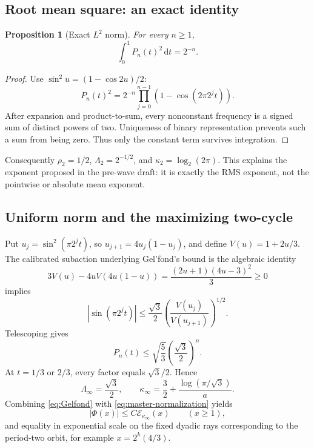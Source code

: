 \documentclass[11pt]{article}
\newtheorem{proposition}[theorem]{Proposition}
\theoremstyle{definition}
\theoremstyle{remark}
\newcommand{\dd}{\,\mathrm d}
\newcommand{\Ecal}{\mathcal E}
\begin{document}
\subsection{Root mean square: an exact identity}

\begin{proposition}[Exact \(L^2\) norm]
\label{prop:L2}
For every \(n\ge1\),
\begin{equation}
 \int_0^1P_n(t)^2\dd t=2^{-n}.
 \label{eq:L2}
\end{equation}
\end{proposition}

\begin{proof}
Use \(\sin^2u=(1-\cos2u)/2\):
\[
 P_n(t)^2=2^{-n}\prod_{j=0}^{n-1}
 (1-\cos(2\pi2^jt)).
\]
After expansion and product-to-sum, every nonconstant frequency is a signed
sum of distinct powers of two.  Uniqueness of binary representation prevents
such a sum from being zero.  Thus only the constant term survives integration.
\end{proof}
Consequently \(\rho_2=1/2\), \(\Lambda_2=2^{-1/2}\), and
\(\kappa_2=\log_2(2\pi)\).  This explains the exponent proposed in the
pre-wave draft: it is exactly the RMS exponent, not the pointwise or absolute
mean exponent.

\subsection{Uniform norm and the maximizing two-cycle}

Put \(u_j=\sin^2(\pi2^jt)\), so
\(u_{j+1}=4u_j(1-u_j)\), and define
\(V(u)=1+2u/3\).  The calibrated subaction underlying Gel'fond's bound\cite{gelfond} is the algebraic identity
\begin{equation}
 3V(u)-4uV(4u(1-u))
 =\frac{(2u+1)(4u-3)^2}{3}\ge0
 \label{eq:subaction-identity}
\end{equation}
implies
\begin{equation}
 |\sin(\pi2^jt)|
 \le\frac{\sqrt3}{2}
 \left(\frac{V(u_j)}{V(u_{j+1})}\right)^{1/2}.
 \label{eq:one-step-Gelfond}
\end{equation}
Telescoping gives
\begin{equation}
 P_n(t)\le\sqrt{\frac53}\left(\frac{\sqrt3}{2}\right)^n.
 \label{eq:Gelfond}
\end{equation}
At \(t=1/3\) or \(2/3\), every factor equals \(\sqrt3/2\).  Hence
\begin{equation}
 \Lambda_\infty=\frac{\sqrt3}{2},
 \qquad
 \kappa_\infty=\frac32+\frac{\log(\pi/\sqrt3)}{a}.
 \label{eq:Linfty}
\end{equation}
Combining \eqref{eq:Gelfond} with \eqref{eq:master-normalization} yields
\begin{equation}
 |\Phi(x)|\le C\Ecal_{\kappa_\infty}(x)
 \qquad(x\ge1),
 \label{eq:pointwise-upper}
\end{equation}
and equality in exponential scale on the fixed dyadic rays corresponding to
the period-two orbit, for example \(x=2^k(4/3)\).
\end{document}
